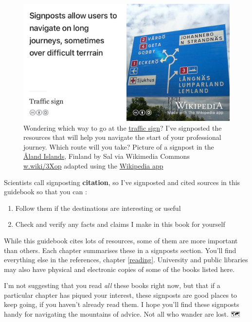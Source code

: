 \documentclass[
]{book}
\providecommand{\tightlist}{%
  \setlength{\itemsep}{0pt}\setlength{\parskip}{0pt}}
\begin{document}
\begin{figure}

{\centering \includegraphics[width=1\linewidth]{images/signposting} 

}

\caption{Wondering which way to go at the \href{https://en.wikipedia.org/wiki/Traffic_sign}{traffic sign}? I've signposted the resources that will help you navigate the start of your professional journey. Which route will you take? Picture of a signpost in the \href{https://en.wikipedia.org/wiki/\%C3\%85land_Islands}{Åland Islands}, Finland by Sal via Wikimedia Commons \href{https://w.wiki/3Xop}{w.wiki/3Xop} adapted using the \href{https://apps.apple.com/us/app/wikipedia/id324715238}{Wikipedia app}}\label{fig:signposting-fig}
\end{figure}



Scientists call signposting \textbf{citation}, so I've signposted and cited sources in this guidebook so that you can :

\begin{enumerate}
\def\labelenumi{\arabic{enumi}.}
\tightlist
\item
  Follow them if the destinations are interesting or useful
\item
  Check and verify any facts and claims I make in this book for yourself
\end{enumerate}

While this guidebook cites lots of resources, some of them are more important than others. Each chapter summarises these in a signposts section. You'll find everything else in the references, chapter \ref{reading}. University and public libraries may also have physical and electronic copies of some of the books listed here.

I'm not suggesting that you read \emph{all} these books right now, but that if a particular chapter has piqued your interest, these signposts are good places to keep going, if you haven't already read them. I hope you'll find these signposts handy for navigating the mountains of advice. Not all who wander are lost. 🗺️🧭
\end{document}
